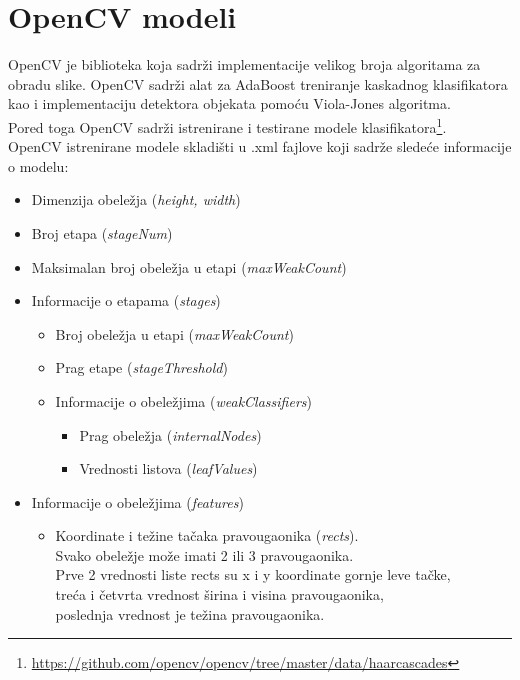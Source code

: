 \section{OpenCV modeli} \label{opencv_model}

OpenCV je biblioteka koja sadrži implementacije velikog broja algoritama za
obradu slike.
OpenCV sadrži alat za AdaBoost treniranje kaskadnog klasifikatora kao i implementaciju
detektora objekata pomoću Viola-Jones algoritma. \\
Pored toga OpenCV sadrži istrenirane i testirane modele klasifikatora\footnote{\url{https://github.com/opencv/opencv/tree/master/data/haarcascades}}.
\cite{OpenCV_docs} \\

\noindent
OpenCV istrenirane modele skladišti u .xml fajlove koji sadrže sledeće
informacije o modelu:

\begin{itemize}
	\item Dimenzija obeležja (\emph{height, width})
	\item Broj etapa (\emph{stageNum})
	\item Maksimalan broj obeležja u etapi (\emph{maxWeakCount})
	\item Informacije o etapama (\emph{stages})
    \begin{itemize}
    \item Broj obeležja u etapi (\emph{maxWeakCount})
    \item Prag etape (\emph{stageThreshold})
    \item Informacije o obeležjima (\emph{weakClassifiers})
      \begin{itemize}
      \item Prag obeležja (\emph{internalNodes})
      \item Vrednosti listova (\emph{leafValues})
      \end{itemize}
    \end{itemize}
	\item Informacije o obeležjima (\emph{features})
    \begin{itemize}
    \item Koordinate i težine tačaka pravougaonika (\emph{rects}). \\
      Svako obeležje može imati 2 ili 3 pravougaonika. \\
      Prve 2 vrednosti liste rects su x i y koordinate gornje leve tačke, \\
      treća i četvrta vrednost širina i visina pravougaonika,  \\
      poslednja vrednost je težina pravougaonika.
    \end{itemize}
\end{itemize}

